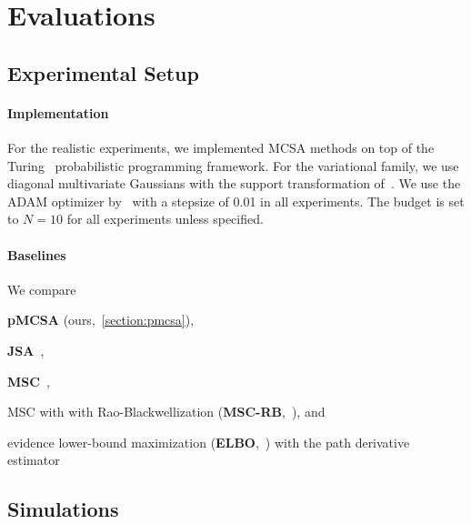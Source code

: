 \vspace{-0.12in}
\section{Evaluations}\label{section:eval}
\vspace{-0.12in}
\subsection{Experimental Setup}
\vspace{-0.09in}
\paragraph{Implementation}
For the realistic experiments, we implemented MCSA methods on top of the Turing~\citep{ge2018t} probabilistic programming framework.
For the variational family, we use diagonal multivariate Gaussians with the support transformation of~\citet{JMLR:v18:16-107}.
We use the ADAM optimizer by~\citet{kingma_adam_2015} with a stepsize of 0.01 in all experiments.
The budget is set to \(N=10\) for all experiments unless specified.

\vspace{-0.1in}
\paragraph{Baselines}
We compare
\begin{enumerate*}[label=\textbf{(\roman*)}]
  \item \textbf{pMCSA} (ours,~\cref{section:pmcsa}),
  \item \textbf{JSA}~\citep{pmlr-v124-ou20a},
  \item \textbf{MSC}~\citep{NEURIPS2020_b2070693},
  \item MSC with with Rao-Blackwellization (\textbf{MSC-RB},~\citealt{NEURIPS2020_b2070693}), and
  \item evidence lower-bound maximization (\textbf{ELBO},~\citealt{pmlr-v33-ranganath14, JMLR:v18:16-107}) with the path derivative estimator~\citep{NIPS2017_e91068ff}
\end{enumerate*}

\vspace{-0.1in}
\subsection{Simulations}\label{section:simulation}
\vspace{-0.1in}
